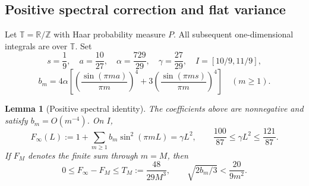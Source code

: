 \documentclass[a4paper,11pt]{article}
\newtheorem{lemma}{Lemma}[section]
\theoremstyle{remark}
\begin{document}
\subsection{Positive spectral correction and flat variance}
Let $\mathbb T=\mathbb R/\mathbb Z$ with Haar probability measure $P$.
All subsequent one-dimensional integrals are over $\mathbb T$. Set
\[
 s=\frac19,\quad a=\frac{10}{27},\quad\alpha=\frac{729}{29},
 \quad\gamma=\frac{27}{29},\quad I=[10/9,11/9],
\]
\[
 b_m=4\alpha\left[\left(\frac{\sin(\pi ma)}{\pi m}\right)^4
 +3\left(\frac{\sin(\pi ms)}{\pi m}\right)^4\right]\quad(m\ge1).
\]
\begin{lemma}[Positive spectral identity]\label{lem:paperplateau}
The coefficients above are nonnegative and satisfy $b_m=O(m^{-4})$. On $I$,
\[
 F_\infty(L):=1+\sum_{m\ge1}b_m\sin^2(\pi mL)=\gamma L^2,
 \qquad \frac{100}{87}\le\gamma L^2\le\frac{121}{87}.
\]
If $F_M$ denotes the finite sum through $m=M$, then
\[
 0\le F_\infty-F_M\le T_M:=\frac{48}{29M^3},\qquad
 \sqrt{2b_m/3}<\frac{20}{9m^2}.
\]
\end{lemma}
\end{document}
